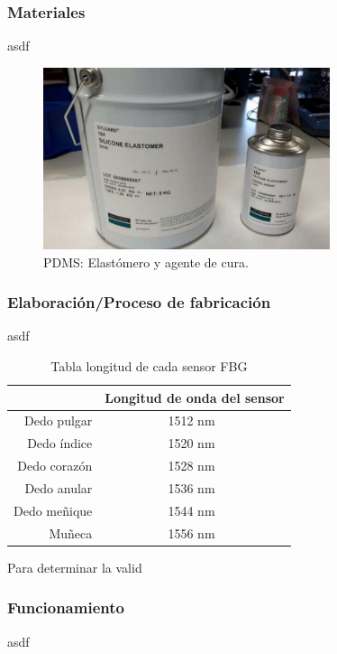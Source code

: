 \subsubsection{Materiales}
asdf
\begin{figure}[H]
	\centering
	\includegraphics[width=0.75\textwidth]{./img/PDMS}
	\caption{PDMS: Elastómero y agente de cura.} \label{fig:pdms}
\end{figure}



\subsubsection{Elaboración/Proceso de fabricación}

asdf

\begin{table}[H]
	\centering
	\begin{tabular}[t]{|r|c|}
		\hline
		 & Longitud de onda del sensor\\
		\hline
		\hline
		Dedo pulgar & 1512 nm \\
		\hline
		Dedo índice & 1520 nm \\
		\hline
		Dedo corazón & 1528 nm \\
		\hline
		Dedo anular & 1536 nm \\
		\hline
		Dedo meñique & 1544 nm \\
		\hline
		Muñeca & 1556 nm \\
		\hline
	\end{tabular}
	\caption{Tabla longitud de cada sensor FBG}
	\label{tabla:medidas 80 cm}
\end{table}


Para determinar la valid


\subsubsection{Funcionamiento}
asdf

